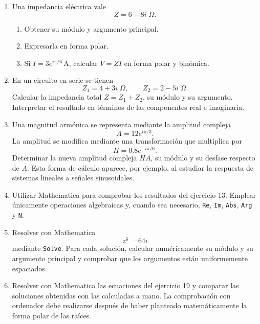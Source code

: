 \begin{enumerate}[label=\textbf{\arabic*.},leftmargin=*]
\item Una impedancia eléctrica vale
\[
Z=6-8i\;\Omega.
\]
\begin{enumerate}[label=\alph*)]
\item Obtener su módulo y argumento principal.
\item Expresarla en forma polar.
\item Si \(I=3e^{i\pi/6}\,\mathrm{A}\), calcular \(V=ZI\) en forma polar y binómica.
\end{enumerate}

\item En un circuito en serie se tienen
\[
Z_1=4+3i\;\Omega,
\qquad
Z_2=2-5i\;\Omega.
\]
Calcular la impedancia total \(Z=Z_1+Z_2\), su módulo y su argumento. Interpretar el resultado en términos de las componentes real e imaginaria.

\item Una magnitud armónica se representa mediante la amplitud compleja
\[
A=12e^{i\pi/3}.
\]
La amplitud se modifica mediante una transformación que multiplica por
\[
H=0.8e^{-i\pi/6}.
\]
Determinar la nueva amplitud compleja \(HA\), su módulo y su desfase respecto de \(A\). Esta forma de cálculo aparece, por ejemplo, al estudiar la respuesta de sistemas lineales a señales sinusoidales.

\item \M Utilizar Mathematica para comprobar los resultados del ejercicio 13. Emplear únicamente operaciones algebraicas y, cuando sea necesario, \texttt{Re}, \texttt{Im}, \texttt{Abs}, \texttt{Arg} y \texttt{N}.

\item \M Resolver con Mathematica
\[
z^6=64i
\]
mediante \texttt{Solve}. Para cada solución, calcular numéricamente su módulo y su argumento principal y comprobar que los argumentos están uniformemente espaciados.

\item \M Resolver con Mathematica las ecuaciones del ejercicio 19 y comparar las soluciones obtenidas con las calculadas a mano. La comprobación con ordenador debe realizarse después de haber planteado matemáticamente la forma polar de las raíces.

\end{enumerate}
